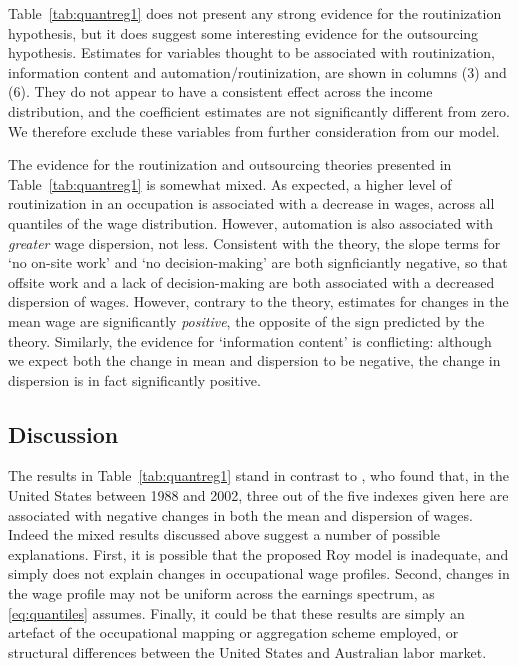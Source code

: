 Table~\ref{tab:quantreg1} does not present any strong evidence for the routinization hypothesis, but it does suggest some interesting evidence for the outsourcing hypothesis. Estimates for variables thought to be associated with routinization, information content and automation/routinization, are shown in columns (3) and (6). They do not appear to have a consistent effect across the income distribution, and the coefficient estimates are not significantly different from zero. We therefore exclude these variables from further consideration from our model.

The evidence for the routinization and outsourcing theories presented in Table~\ref{tab:quantreg1} is somewhat mixed. As expected, a higher level of routinization in an occupation is associated with a decrease in wages, across all quantiles of the wage distribution. However, automation is also associated with {\em greater} wage dispersion, not less. Consistent with the theory, the slope terms for `no on-site work' and `no decision-making' are both signficiantly negative, so that offsite work and a lack of decision-making are both associated with a decreased dispersion of wages. However, contrary to the theory, estimates for changes in the mean wage are significantly {\em positive}, the opposite of the sign predicted by the theory. Similarly, the evidence for `information content' is conflicting: although we expect both the change in mean and dispersion to be negative, the change in dispersion is in fact significantly positive.

\subsection{Discussion}

The results in Table~\ref{tab:quantreg1} stand in contrast to \citet{Firpo2011}, who found that, in the United States between 1988 and 2002, three out of the five indexes given here are associated with negative changes in both the mean and dispersion of wages. Indeed the mixed results discussed above suggest a number of possible explanations. First, it is possible that the proposed Roy model is inadequate, and simply does not explain changes in occupational wage profiles. Second, changes in the wage profile may not be uniform across the earnings spectrum, as \eqref{eq:quantiles} assumes. Finally, it could be that these results are simply an artefact of the occupational mapping or aggregation scheme employed, or structural differences between the United States and Australian labor market.

